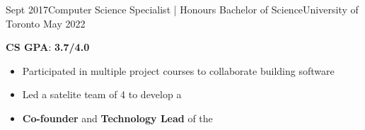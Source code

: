%
%
%


\begin{experiences}
  \university
    {Sept 2017}{Computer Science Specialist | Honours Bachelor of Science}{University of Toronto}
    {May 2022} {
                      \textbf{CS GPA}: \textbf{3.7/4.0}
                      \begin{itemize}
                        \setlength\itemsep{0.2em}
                        \item Participated in multiple project courses to collaborate building software
                        \item Led a satelite team of 4 to develop a 
                        \item \textbf{Co-founder} and \textbf{Technology Lead} of the 
                      \end{itemize}
                    }
\end{experiences}
